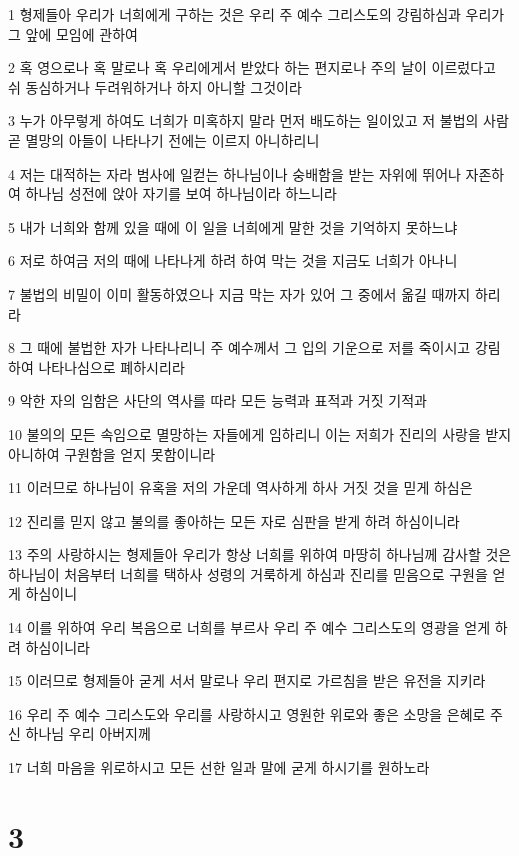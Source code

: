 \par 1 형제들아 우리가 너희에게 구하는 것은 우리 주 예수 그리스도의 강림하심과 우리가 그 앞에 모임에 관하여
\par 2 혹 영으로나 혹 말로나 혹 우리에게서 받았다 하는 편지로나 주의 날이 이르렀다고 쉬 동심하거나 두려워하거나 하지 아니할 그것이라
\par 3 누가 아무렇게 하여도 너희가 미혹하지 말라 먼저 배도하는 일이있고 저 불법의 사람 곧 멸망의 아들이 나타나기 전에는 이르지 아니하리니
\par 4 저는 대적하는 자라 범사에 일컫는 하나님이나 숭배함을 받는 자위에 뛰어나 자존하여 하나님 성전에 앉아 자기를 보여 하나님이라 하느니라
\par 5 내가 너희와 함께 있을 때에 이 일을 너희에게 말한 것을 기억하지 못하느냐
\par 6 저로 하여금 저의 때에 나타나게 하려 하여 막는 것을 지금도 너희가 아나니
\par 7 불법의 비밀이 이미 활동하였으나 지금 막는 자가 있어 그 중에서 옮길 때까지 하리라
\par 8 그 때에 불법한 자가 나타나리니 주 예수께서 그 입의 기운으로 저를 죽이시고 강림하여 나타나심으로 폐하시리라
\par 9 악한 자의 임함은 사단의 역사를 따라 모든 능력과 표적과 거짓 기적과
\par 10 불의의 모든 속임으로 멸망하는 자들에게 임하리니 이는 저희가 진리의 사랑을 받지 아니하여 구원함을 얻지 못함이니라
\par 11 이러므로 하나님이 유혹을 저의 가운데 역사하게 하사 거짓 것을 믿게 하심은
\par 12 진리를 믿지 않고 불의를 좋아하는 모든 자로 심판을 받게 하려 하심이니라
\par 13 주의 사랑하시는 형제들아 우리가 항상 너희를 위하여 마땅히 하나님께 감사할 것은 하나님이 처음부터 너희를 택하사 성령의 거룩하게 하심과 진리를 믿음으로 구원을 얻게 하심이니
\par 14 이를 위하여 우리 복음으로 너희를 부르사 우리 주 예수 그리스도의 영광을 얻게 하려 하심이니라
\par 15 이러므로 형제들아 굳게 서서 말로나 우리 편지로 가르침을 받은 유전을 지키라
\par 16 우리 주 예수 그리스도와 우리를 사랑하시고 영원한 위로와 좋은 소망을 은혜로 주신 하나님 우리 아버지께
\par 17 너희 마음을 위로하시고 모든 선한 일과 말에 굳게 하시기를 원하노라

\chapter{3}

